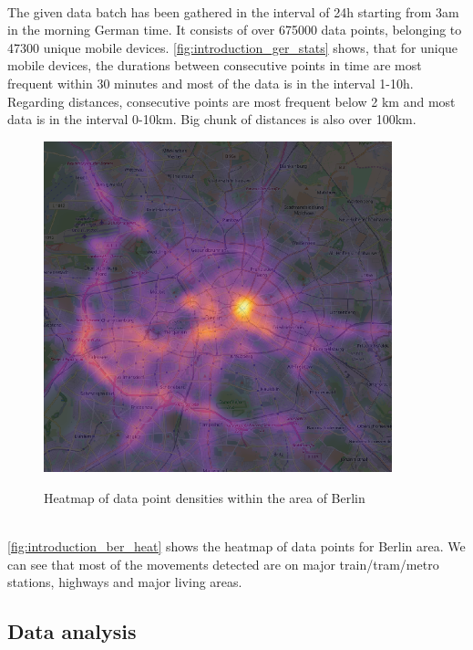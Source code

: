 \\
The given data batch has been gathered in the interval of 24h starting from 3am in the morning German time. It consists of over 675000 data points, belonging to 47300 unique mobile devices. \autoref{fig:introduction_ger_stats} shows, that for unique mobile devices, the durations between consecutive points in time are most frequent within 30 minutes and most of the data is in the interval 1-10h. Regarding distances, consecutive points are most frequent below 2 km and most data is in the interval 0-10km. Big chunk of distances is also over 100km.     
\\
\begin{figure}[!ht]
	\centering
	\includegraphics[width=0.9\textwidth]{images/points_berlin_heatmap.png}\\
	\caption{Heatmap of data point densities within the area of Berlin}
	\label{fig:introduction_ber_heat}
\end{figure}
\\
\autoref{fig:introduction_ber_heat} shows the heatmap of data points for Berlin area. We can see that most of the movements detected are on major train/tram/metro stations, highways and major living areas. 

\subsection{Data analysis}
\label{cha:introduction_dataanaly}

